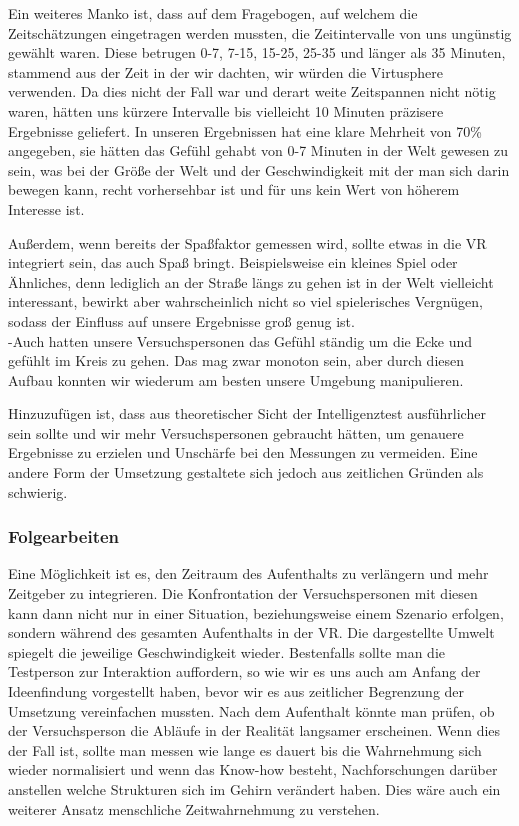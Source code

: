 \documentclass{Bericht}
\begin{document}
Ein weiteres Manko ist, dass auf dem Fragebogen, auf welchem die Zeitschätzungen eingetragen werden mussten,  die Zeitintervalle von uns ungünstig gewählt waren. Diese betrugen 0-7, 7-15, 15-25, 25-35 und länger als 35 Minuten, stammend aus der Zeit in der wir dachten, wir würden die Virtusphere verwenden. Da dies nicht der Fall war und derart weite Zeitspannen nicht nötig waren, hätten uns kürzere Intervalle bis vielleicht 10 Minuten präzisere Ergebnisse geliefert. In unseren Ergebnissen hat eine klare Mehrheit von 70\% angegeben, sie hätten das Gefühl gehabt von 0-7 Minuten in der Welt gewesen zu sein, was bei der Größe der Welt und der Geschwindigkeit mit der man sich darin bewegen kann, recht vorhersehbar ist und für uns kein Wert von höherem Interesse ist.

Außerdem, wenn bereits der Spaßfaktor gemessen wird, sollte etwas in die VR integriert sein, das auch Spaß bringt. Beispielsweise ein kleines Spiel oder Ähnliches, denn lediglich an der Straße längs zu gehen ist in der Welt vielleicht interessant, bewirkt aber wahrscheinlich nicht so viel spielerisches Vergnügen, sodass der Einfluss auf unsere Ergebnisse groß  genug ist. \\
 -Auch hatten unsere Versuchspersonen das Gefühl ständig um die Ecke und gefühlt im Kreis zu gehen. Das mag zwar monoton sein, aber durch diesen Aufbau konnten wir wiederum am besten unsere Umgebung manipulieren.

Hinzuzufügen ist, dass aus theoretischer Sicht der Intelligenztest ausführlicher sein sollte und wir mehr Versuchspersonen gebraucht hätten, um genauere Ergebnisse zu erzielen und Unschärfe bei den Messungen zu vermeiden.
Eine andere Form der Umsetzung gestaltete sich jedoch aus zeitlichen Gründen als schwierig.

\subsubsection{Folgearbeiten}
Eine Möglichkeit ist es, den Zeitraum des Aufenthalts zu verlängern und mehr Zeitgeber zu integrieren. Die Konfrontation der Versuchspersonen mit diesen kann dann nicht nur in einer Situation, beziehungsweise einem Szenario erfolgen, sondern während des gesamten Aufenthalts in der VR. Die dargestellte Umwelt spiegelt die jeweilige Geschwindigkeit wieder. Bestenfalls sollte man die Testperson zur Interaktion auffordern, so wie wir es uns auch am Anfang der Ideenfindung vorgestellt haben, bevor wir es aus zeitlicher Begrenzung der Umsetzung vereinfachen mussten. Nach dem Aufenthalt könnte man prüfen, ob der Versuchsperson die Abläufe in der Realität langsamer erscheinen. Wenn dies der Fall ist, sollte man messen wie lange es dauert bis die Wahrnehmung sich wieder normalisiert und wenn das Know-how besteht, Nachforschungen darüber anstellen welche Strukturen sich im Gehirn verändert haben. Dies wäre auch ein weiterer Ansatz menschliche Zeitwahrnehmung zu verstehen.
\end{document}
